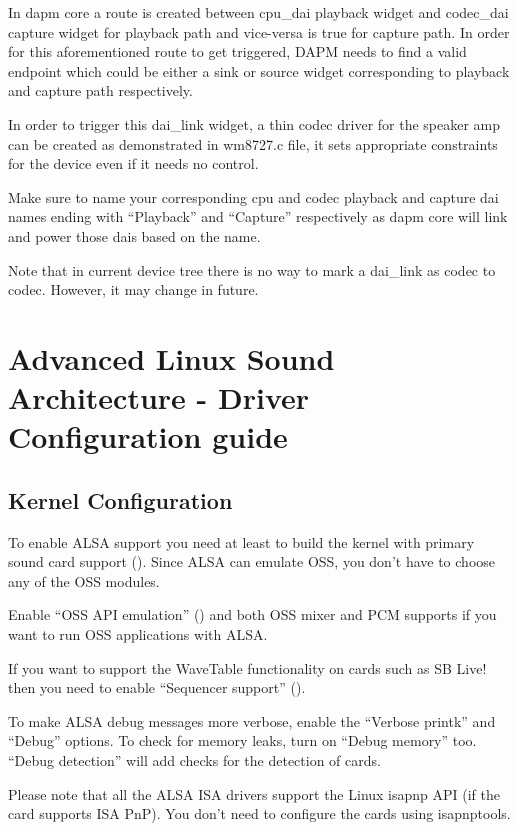 \documentclass[a4paper,8pt,english]{sphinxmanual}
\begin{document}
In dapm core a route is created between cpu\_dai playback widget
and codec\_dai capture widget for playback path and vice-versa is
true for capture path. In order for this aforementioned route to get
triggered, DAPM needs to find a valid endpoint which could be either
a sink or source widget corresponding to playback and capture path
respectively.

In order to trigger this dai\_link widget, a thin codec driver for
the speaker amp can be created as demonstrated in wm8727.c file, it
sets appropriate constraints for the device even if it needs no control.

Make sure to name your corresponding cpu and codec playback and capture
dai names ending with ``Playback'' and ``Capture'' respectively as dapm core
will link and power those dais based on the name.

Note that in current device tree there is no way to mark a dai\_link
as codec to codec. However, it may change in future.


\chapter{Advanced Linux Sound Architecture - Driver Configuration guide}
\label{sound/alsa-configuration:advanced-linux-sound-architecture-driver-configuration-guide}\label{sound/alsa-configuration::doc}

\section{Kernel Configuration}
\label{sound/alsa-configuration:kernel-configuration}
To enable ALSA support you need at least to build the kernel with
primary sound card support ().  Since ALSA can emulate
OSS, you don't have to choose any of the OSS modules.

Enable ``OSS API emulation'' () and both OSS mixer
and PCM supports if you want to run OSS applications with ALSA.

If you want to support the WaveTable functionality on cards such as
SB Live! then you need to enable ``Sequencer support''
().

To make ALSA debug messages more verbose, enable the ``Verbose printk''
and ``Debug'' options.  To check for memory leaks, turn on ``Debug memory''
too.  ``Debug detection'' will add checks for the detection of cards.

Please note that all the ALSA ISA drivers support the Linux isapnp API
(if the card supports ISA PnP).  You don't need to configure the cards
using isapnptools.
\end{document}
